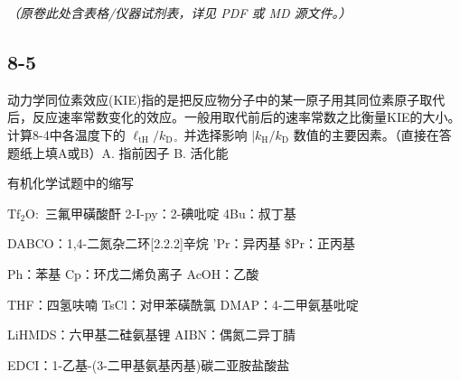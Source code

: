 \textit{（原卷此处含表格/仪器试剂表，详见 PDF 或 MD 源文件。）}

\subsection*{8-5}
动⼒学同位素效应(KIE)指的是把反应物分⼦中的某⼀原⼦⽤其同位素原⼦取代后，反应速率常数变化的效应。⼀般⽤取代前后的速率常数之⽐衡量KIE的⼤⼩。计算8-4中各温度下的 $\mathrm { \ell } _ { \mathrm { t H } } / k _ { \mathrm { D } \circ }$ 并选择影响 $| k _ { \mathrm { H } } / k _ { \mathrm { D } }$ 数值的主要因素。（直接在答题纸上填A或B）A. 指前因⼦ B. 活化能

有机化学试题中的缩写

$\mathrm { T f _ { 2 } O } \colon$ 三氟甲磺酸酐 2-I-py：2-碘吡啶 4Bu：叔丁基

DABCO：1,4-⼆氮杂⼆环[2.2.2]⾟烷 'Pr：异丙基 \$Pr：正丙基

Ph：苯基 Cp：环戊⼆烯负离⼦ AcOH：⼄酸

THF：四氢呋喃 TsCl：对甲苯磺酰氯 DMAP：4-⼆甲氨基吡啶

LiHMDS：六甲基⼆硅氨基锂 AIBN：偶氮⼆异丁腈

EDCI：1-⼄基-(3-⼆甲基氨基丙基)碳⼆亚胺盐酸盐
